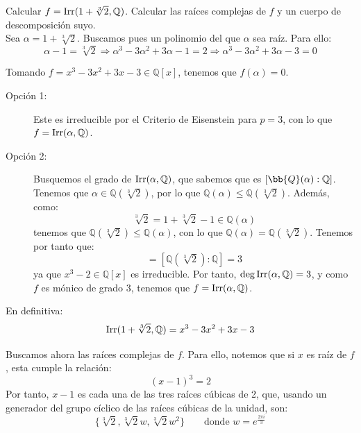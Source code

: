 \begin{ejercicio}
    Calcular $f= \operatorname{Irr}(1+\sqrt[3]{2},\mathbb{Q})$. Calcular las raíces complejas de $f$ y un cuerpo de descomposición suyo.\\

    Sea $\alpha = 1+ \sqrt[3]{2}$. Buscamos pues un polinomio del que $\alpha$ sea raíz. Para ello: 
    \begin{equation*}
        \alpha - 1 = \sqrt[3]{2} \Longrightarrow \alpha^3 - 3\alpha^2 + 3\alpha - 1 = 2 \Longrightarrow \alpha^3 - 3\alpha^2 + 3\alpha - 3 = 0
    \end{equation*}

    Tomando $f = x^3-3x^2+3x-3\in \mathbb{Q}[x]$, tenemos que $f(\alpha)=0$.
    \begin{description}
        \item[Opción 1:] Este es irreducible por el Criterio de Eisenstein para $p=3$, con lo que $f = \operatorname{Irr}(\alpha,\mathbb{Q})$.
        \item[Opción 2:] Busquemos el grado de $\operatorname{Irr}(\alpha,\mathbb{Q})$, que sabemos que es $[\bb{Q}(\alpha):\mathbb{Q}]$.\\
        
        Tenemos que $\alpha\in \mathbb{Q}\left(\sqrt[3]{2}\right)$, por lo que $\mathbb{Q}(\alpha)\leq \mathbb{Q}\left(\sqrt[3]{2}\right)$. Además, como:
        \begin{equation*}
            \sqrt[3]{2} = 1+\sqrt[3]{2} - 1 \in \mathbb{Q}(\alpha)
        \end{equation*}
        tenemos que $\mathbb{Q}\left(\sqrt[3]{2}\right) \leq \mathbb{Q}(\alpha)$, con lo que $\mathbb{Q}(\alpha) = \mathbb{Q}\left(\sqrt[3]{2}\right)$. Tenemos por tanto que:
        \begin{equation*}
            [\mathbb{Q}(\alpha):\mathbb{Q}] = \left[\mathbb{Q}\left(\sqrt[3]{2}\right):\mathbb{Q}\right] = 3
        \end{equation*}
        ya que $x^3-2\in \mathbb{Q}[x]$ es irreducible. Por tanto, $\deg \operatorname{Irr}(\alpha,\mathbb{Q}) = 3$, y como $f$ es mónico de grado 3, tenemos que $f = \operatorname{Irr}(\alpha,\mathbb{Q})$.
    \end{description}

     En definitiva:
    \begin{equation*}
        \operatorname{Irr}(1+\sqrt[3]{2},\mathbb{Q}) = x^3-3x^2+3x-3
    \end{equation*} 
    
    Buscamos ahora las raíces complejas de $f$. Para ello, notemos que si $x$ es raíz de $f$, esta cumple la relación:
    \begin{equation*}
        {(x-1)}^{3} = 2
    \end{equation*}
    Por tanto, $x-1$ es cada una de las tres raíces cúbicas de 2, que, usando un generador del grupo cíclico de las raíces cúbicas de la unidad, son:
    \begin{equation*}
        \{\sqrt[3]{2}, \sqrt[3]{2}w, \sqrt[3]{2}w^2\}\qquad \text{donde } w = e^{\frac{2\pi i}{3}}
    \end{equation*}


\end{ejercicio}
